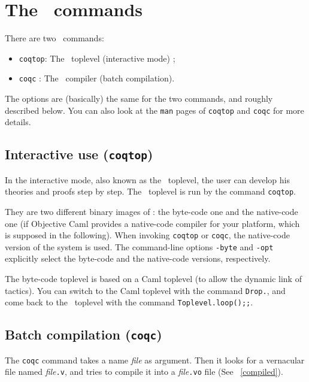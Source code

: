 \chapter{The \Coq~commands}\label{Addoc-coqc}

There are two \Coq~commands: 
\begin{itemize}
\item {\tt coqtop}: The \Coq\ toplevel (interactive mode) ; 
\item {\tt coqc} : The \Coq\ compiler (batch compilation).
\end{itemize}
The options are (basically) the same for the two commands, and
roughly described below. You can also look at the \verb!man! pages of
\verb!coqtop! and \verb!coqc! for more details.


\section{Interactive use ({\tt coqtop})}

In the interactive mode, also known as the \Coq~toplevel, the user can
develop his theories and proofs step by step.  The \Coq~toplevel is
run by the command {\tt coqtop}. 

\label{binary-images}
They are two different binary images of \Coq: the byte-code one and
the native-code one (if Objective Caml provides a native-code compiler
for your platform, which is supposed in the following).  When invoking
\verb!coqtop! or \verb!coqc!, the native-code version of the system is
used.  The command-line options \verb!-byte! and \verb!-opt! explicitly
select the byte-code and the native-code versions, respectively.

The byte-code toplevel is based on a Caml
toplevel (to allow the dynamic link of tactics).  You can switch to
the Caml toplevel with the command \verb!Drop.!, and come back to the
\Coq~toplevel with the command \verb!Toplevel.loop();;!.


\section{Batch compilation ({\tt coqc})}
The {\tt coqc} command takes a name {\em file} as argument.  Then it
looks for a vernacular file named {\em file}{\tt .v}, and tries to
compile it into a {\em file}{\tt .vo} file (See ~\ref{compiled}).

